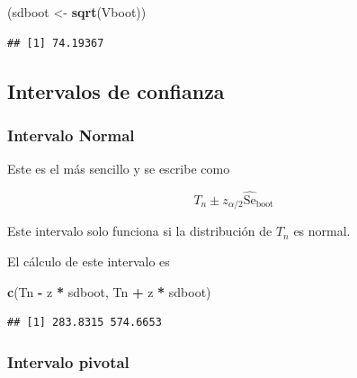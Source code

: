 \documentclass[
  12pt,
]{book}
\newenvironment{Shaded}{\begin{snugshade}}{\end{snugshade}}
\newcommand{\KeywordTok}[1]{\textcolor[rgb]{0.13,0.29,0.53}{\textbf{#1}}}
\newcommand{\NormalTok}[1]{#1}
\newcommand{\OperatorTok}[1]{\textcolor[rgb]{0.81,0.36,0.00}{\textbf{#1}}}
\newcommand{\StringTok}[1]{\textcolor[rgb]{0.31,0.60,0.02}{#1}}
\theoremstyle{definition}
\theoremstyle{definition}
\theoremstyle{definition}
\theoremstyle{remark}
\let\BeginKnitrBlock\begin \let\EndKnitrBlock\end
\begin{document}
\begin{Shaded}
\begin{Highlighting}[]
\NormalTok{(sdboot <-}\StringTok{ }\KeywordTok{sqrt}\NormalTok{(Vboot))}
\end{Highlighting}
\end{Shaded}

\begin{verbatim}
## [1] 74.19367
\end{verbatim}

\texttt{}

\hypertarget{intervalos-de-confianza}{%
\subsection{Intervalos de confianza}\label{intervalos-de-confianza}}

\subsubsection{Intervalo Normal}

Este es el más sencillo y se escribe como

\begin{equation}
T_{n} \pm z_{\alpha / 2} \widehat{\mathrm{Se}}_{\mathrm{boot}}
\end{equation}

\BeginKnitrBlock{remark}
{}Este intervalo solo funciona si la distribución de \(T_{n}\) es normal.
\EndKnitrBlock{remark}

\BeginKnitrBlock{exercise}
\protect\hypertarget{exr:unnamed-chunk-94}{}{\label{exr:unnamed-chunk-94} }El cálculo de este intervalo es
\EndKnitrBlock{exercise}

\begin{Shaded}
\begin{Highlighting}[]
\KeywordTok{c}\NormalTok{(Tn }\OperatorTok{-}\StringTok{ }\NormalTok{z }\OperatorTok{*}\StringTok{ }\NormalTok{sdboot, Tn }\OperatorTok{+}\StringTok{ }\NormalTok{z }\OperatorTok{*}\StringTok{ }\NormalTok{sdboot)}
\end{Highlighting}
\end{Shaded}

\begin{verbatim}
## [1] 283.8315 574.6653
\end{verbatim}

\texttt{}

\subsubsection{Intervalo pivotal}
\end{document}
